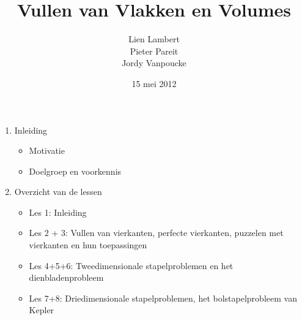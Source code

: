 \documentclass[dutch]{beamer}
\title[Vullen van Vlakken en Volumes]{Vullen van Vlakken en Volumes}
\author[Lien Lambert \& Pieter Pareit \& Jordy Vanpoucke ]{Lien Lambert \\Pieter Pareit \\Jordy Vanpoucke}
\date{\tiny 15 mei 2012}
\begin{document}
\frame{
\titlepage}


\begin{frame}

\begin{enumerate}
	\item Inleiding
	  \begin{itemize}
	    \item Motivatie
	    \item Doelgroep en voorkennis
    \end{itemize}
  \item Overzicht van de lessen
    \begin{itemize}
	    \item Les 1: Inleiding
	    \item Les 2 + 3: Vullen van vierkanten, perfecte vierkanten, puzzelen met vierkanten en hun toepassingen
	    \item Les 4+5+6: Tweedimensionale stapelproblemen en het dienbladenprobleem
	    \item Les 7+8: Driedimensionale stapelproblemen, het bolstapelprobleem van Kepler
    \end{itemize}
\end{enumerate}
\end{frame}
\end{document}
